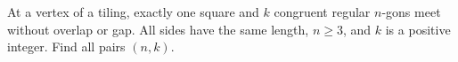 At a vertex of a tiling, exactly one square and $k$ congruent regular $n$-gons meet without overlap or gap. All sides have the same length, $n\ge3$, and $k$ is a positive integer. Find all pairs $(n,k)$.

